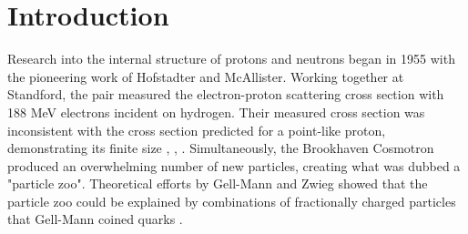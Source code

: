 

%


% 


\chapter{Introduction}
Research into the internal structure of protons and neutrons began in 1955 with the pioneering work of Hofstadter and McAllister.  Working together at Standford, the pair measured the electron-proton scattering cross section with 188 MeV electrons incident on hydrogen. Their measured cross section was inconsistent with the cross section predicted for a point-like proton, demonstrating its finite size \cite{history-hofstadter:1955}, \cite{history-hofstadter:1956}, \cite{history-chambers:1956}.  Simultaneously, the Brookhaven Cosmotron produced an overwhelming number of new particles, creating what was dubbed a "particle zoo".  Theoretical efforts by Gell-Mann and Zwieg showed that the particle zoo could be explained by combinations of fractionally charged particles that Gell-Mann coined quarks \cite{history-zweig:1964}.  

